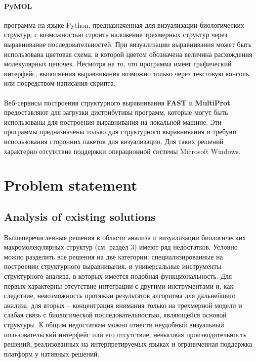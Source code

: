 \documentclass[a4paper, 12pt, titlepage, utf8]{extarticle}
\let\oldsection\section         %
\renewcommand{\section}{\newpage\oldsection}
\begin{document}
\begin{original}
\begin{original}
\paragraph{PyMOL \cite{pymol}}
программа на языке Python, предназначенная для визуализации биологических
структур, с возможностью строить наложение трехмерных структур через
выравнивание последовательностей. При визуализации выравнивания может быть
использована цветовая схема, в которой цветом обозначена величина расхождения
молекулярных цепочек. Несмотря на то, что программа имеет графический интерфейс,
выполнения выравнивания возможно только через текстовую консоль, или посредством
написания скрипта.

\paragraph{}
Веб-сервисы построения структурного выравнивания \textbf{FAST} и
\textbf{MultiProt} предоставляют для загрузки дистрибутивы программ, которые
могут быть использованы для построения выравнивания на локальной машине. Эти
программы предназначены только для структурного выравнивания и требуют
использования сторонних пакетов для визуализации. Для таких решений характерно
отсутствие поддержки операционной системы Microsoft Windows.


\section{Problem statement}	%

\subsection{Analysis of existing solutions}
Вышеперечисленные решения в области анализа и визуализации биологических
макромолекулярных структур (см. раздел 3) имеют ряд недостатков. Условно можно
разделить все решения на две категории: специализированные на построении
структурного выравнивания, и универсальные инструменты структурного анализа, в
которых имеется подобная функциональность. Для первых характерны отсутствие
интеграции с другими инструментами и, как следствие, невозможность протяжки
результатов алгоритма для дальнейшего анализа, для вторых -- концентрация
внимания только на трехмерной модели и слабая связь с биологической
последовательностью, являющейся основой структуры. К общим недостаткам можно
отнести неудобный визуальный пользовательский интерфейс или его отсутствие,
невысокая производительность решений, реализованных на интерпретируемых языках и
ограниченная поддержка платформ у нативных решений.


\end{original}
\end{original}
\end{document}
